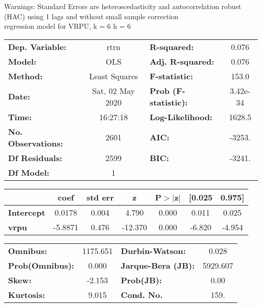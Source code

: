 Warnings: \newline
 [1] Standard Errors are heteroscedasticity and autocorrelation robust (HAC) using 1 lags and without small sample correction\\ 

regression model for VRPU, k = 6 h = 6\begin{center}
\begin{tabular}{lclc}
\toprule
\textbf{Dep. Variable:}    &       rtrn       & \textbf{  R-squared:         } &     0.076   \\
\textbf{Model:}            &       OLS        & \textbf{  Adj. R-squared:    } &     0.076   \\
\textbf{Method:}           &  Least Squares   & \textbf{  F-statistic:       } &     153.0   \\
\textbf{Date:}             & Sat, 02 May 2020 & \textbf{  Prob (F-statistic):} &  3.42e-34   \\
\textbf{Time:}             &     16:27:18     & \textbf{  Log-Likelihood:    } &    1628.5   \\
\textbf{No. Observations:} &        2601      & \textbf{  AIC:               } &    -3253.   \\
\textbf{Df Residuals:}     &        2599      & \textbf{  BIC:               } &    -3241.   \\
\textbf{Df Model:}         &           1      & \textbf{                     } &             \\
\bottomrule
\end{tabular}
\begin{tabular}{lcccccc}
                   & \textbf{coef} & \textbf{std err} & \textbf{z} & \textbf{P$> |$z$|$} & \textbf{[0.025} & \textbf{0.975]}  \\
\midrule
\textbf{Intercept} &       0.0178  &        0.004     &     4.790  &         0.000        &        0.011    &        0.025     \\
\textbf{vrpu}      &      -5.8871  &        0.476     &   -12.370  &         0.000        &       -6.820    &       -4.954     \\
\bottomrule
\end{tabular}
\begin{tabular}{lclc}
\textbf{Omnibus:}       & 1175.651 & \textbf{  Durbin-Watson:     } &    0.028  \\
\textbf{Prob(Omnibus):} &   0.000  & \textbf{  Jarque-Bera (JB):  } & 5929.607  \\
\textbf{Skew:}          &  -2.153  & \textbf{  Prob(JB):          } &     0.00  \\
\textbf{Kurtosis:}      &   9.015  & \textbf{  Cond. No.          } &     159.  \\
\bottomrule
\end{tabular}
\end{center}

